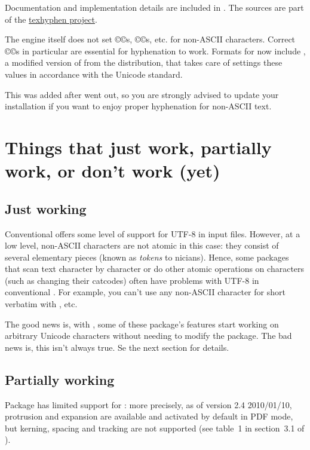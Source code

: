 \documentclass{lltxdoc}
\begin{document}
Documentation and implementation details are included in
. The sources are part of the
\href{http://tug.org/tex-hyphen/}{texhyphen project}.

The engine itself does not set ©\catcode©s, ©\lccode©s, etc. for non-ASCII
characters. Correct ©\lccode©s in particular are essential for hyphenation to
work. Formats for \luatex now include , a
modified version of  from the \xetex distribution,
that takes care of settings these values in accordance with the Unicode
standard.

This was added after  went out, so you are strongly advised to
update your installation if you want to enjoy proper hyphenation for non-ASCII
text.


\section{Things that just work, partially work, or don't work (yet)}
\label{workornot}

\subsection{Just working}\label{working}

Conventional \latex offers some level of support for UTF-8 in input files.
However, at a low level, non-ASCII characters are not atomic in this case:
they consist of several elementary pieces (known as \emph{tokens} to
\tex{}nicians). Hence, some packages that scan text character by character or
do other atomic operations on characters (such as changing their catcodes)
often have problems with UTF-8 in conventional \latex. For example, you can't
use any non-ASCII character for short verbatim with , etc.

The good news is, with \lualatex, some of these package's features start
working on arbitrary Unicode characters without needing to modify the package.
The bad news is, this isn't always true. Se the next section for details.

\subsection{Partially working}\label{partial}

Package  has limited support for \luatex: more precisely, as of
version 2.4 2010/01/10, protrusion and expansion are available and activated
by default in PDF mode, but kerning, spacing and tracking are not supported
(see table~1 in section~3.1 of ).
\end{document}
